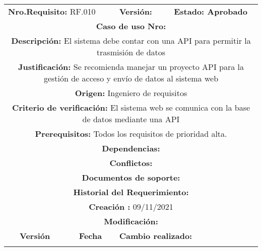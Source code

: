 \begin{center}
\begin{tabular}{|c|c|p{4cm}|p{4cm}|}
            \hline
            \rowcolor{red} \multicolumn{4}{|c|}{\textbf{Prioridad:} Alta}  \\
            \hline
            \multicolumn{2}{|l}{\textbf{Nro.Requisito: }RF.010} & \multicolumn{1}{|l}{\textbf{Versión: }} & \multicolumn{1}{|l|}{\textbf{Estado: Aprobado}} \\
            \multicolumn{4}{|p{13cm}|}{\textbf{Caso de uso Nro: }}  \\
            \hline
            \multicolumn{4}{|p{13cm}|}{\textbf{Descripción: } El sistema debe contar con una API para permitir la trasmisión de datos } \\
            \multicolumn{4}{|p{13cm}|}{\textbf{Justificación: } Se recomienda manejar un proyecto API para la gestión de acceso y envío de datos al sistema web} \\ 
            \multicolumn{4}{|p{13cm}|}{\textbf{Origen: }Ingeniero de requisitos}  \\
            \multicolumn{4}{|p{13cm}|}{\textbf{Criterio de verificación: } El sistema web se comunica con la base de datos mediante una API} \\
            \hline
            \multicolumn{4}{|p{13cm}|}{\textbf{Prerequisitos: } Todos los requisitos de prioridad alta. }\\
            \hline \multicolumn{4}{|p{12cm}|}{\textbf{Dependencias: }
               
              }  \\
            \multicolumn{4}{|p{12cm}|}{\textbf{Conflictos: }}  \\
            \hline
            \multicolumn{4}{|p{12cm}|}{\textbf{Documentos de soporte: }}  \\
            \hline
            \multicolumn{4}{|p{12cm}|}{\textbf{Historial del Requerimiento: }}  \\
            \multicolumn{4}{|p{12cm}|}{\textbf{Creación : }09/11/2021}  \\
            \multicolumn{4}{|p{12cm}|}{\textbf{Modificación: }}  \\
             \textbf{Versión} & \textbf{Fecha} & \multicolumn{2}{p{8cm}|}{\textbf{Cambio realizado:}} \\
            \hline
                 & &   \multicolumn{2}{p{8cm}|}{}
              \\
            \hline
\end{tabular}




\end{center}

